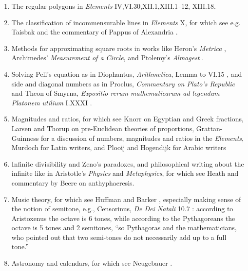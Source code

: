 \documentclass{article}
\begin{document}
\begin{enumerate}
\item The regular polygons in {\em Elements} IV,VI.30,XII.1,XIII.1--12, XIII.18.
\item The classification of incommensurable lines in {\em Elements} X, for which see e.g. Taisbak \cite{quadrangles} and the commentary of Pappus of Alexandria \cite{pappusX}.
\item Methods for approximating  square roots in works like Heron's {\em Metrica} \cite{metrica}, 
Archimedes' {\em Measurement of a Circle}, and Ptolemy's {\em Almagest} \cite{almagest}.
\item Solving Pell's equation as in
Diophantus, {\em Arithmetica}, Lemma to VI.15 \cite[p.~238]{diophantus}, and side and diagonal numbers as in Proclus, {\em Commentary on Plato's
Republic} \cite[pp.~133--135]{festugiereII} and Theon of Smyrna,
{\em Expositio rerum mathematicarum ad legendum Platonem utilium} I.XXXI  \cite[pp.~70--75]{dupuis}.
\item Magnitudes and ratios, for which see Knorr \cite{knorr1982} on Egyptian and Greek fractions,
Larsen \cite{larsen} and Thorup \cite{thorup} on pre-Euclidean theories of proportions,
Grattan-Guinness \cite{grattan} for a discussion of numbers, magnitudes and ratios in the {\em Elements},
Murdoch \cite{murdoch} for Latin writers, and Plooij \cite{plooij} and Hogendijk \cite{hogendijk} for Arabic writers
\item Infinite divisibility and Zeno's paradoxes, and philosophical writing about the infinite like in 
Aristotle's {\em Physics} and {\em Metaphysics}, for which see Heath \cite{aristotle} and commentary by Beere \cite[pp.~127--129]{beere} on anthyphaeresis.
\item Music theory, for which  see Huffman  \cite{philolaus} and Barker \cite{barker}, especially making sense of the notion of semitone, e.g., Censorinus, {\em De Dei Natali} 10.7 \cite[p.~18]{censorinus}:
according to Aristoxenus the octave is 6 tones, while
according to the Pythagoreans the octave is 5 tones and 2 semitones, ``so Pythagoras and the mathematicians, who pointed
out that two semi-tones do not necessarily add up to a full tone.''
\item Astronomy and calendars, for which see Neugebauer \cite{neugebauer}.
\end{enumerate}
\end{document}
